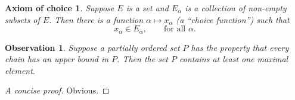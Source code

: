 \newtheorem*{axiomofchoice}{Axiom of choice}
\begin{axiomofchoice}
    Suppose $E$ is a set and ${E_\alpha}$ is a collection of
    non-empty subsets of $E$. Then there is a function $\alpha
    \mapsto x_\alpha$ (a ``choice function'') such that
    \begin{equation}
        x_\alpha \in E_\alpha,\qquad \text{for all }\alpha.
    \end{equation}
\end{axiomofchoice}

\newtheorem{observation}{Observation}
\begin{observation}
    Suppose a partially ordered set $P$ has the property
    that every chain has an upper bound in $P$. Then the
    set $P$ contains at least one maximal element.
\end{observation}
\begin{proof}[A concise proof]
    Obvious.
\end{proof}
